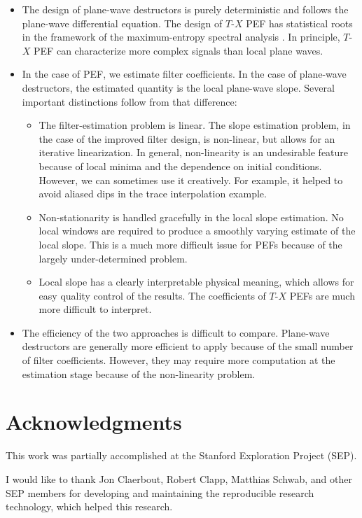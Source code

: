 \begin{itemize}
\item The design of plane-wave destructors is purely deterministic and
  follows the plane-wave differential equation. The design of $T$-$X$
  PEF has statistical roots in the framework of the maximum-entropy
  spectral analysis \cite[]{Burg.sepphd.6}. In principle, $T$-$X$ PEF
  can characterize more complex signals than local plane waves.
\item In the case of PEF, we estimate filter coefficients. In the
  case of plane-wave destructors, the estimated quantity is the local
  plane-wave slope.  Several important distinctions follow from that
  difference:
\begin{itemize}
\item The filter-estimation problem is linear. The slope estimation
  problem, in the case of the improved filter design, is non-linear,
  but allows for an iterative linearization. In general, non-linearity
  is an undesirable feature because of local minima and the dependence
  on initial conditions. However, we can sometimes use it creatively.
  For example, it helped to avoid aliased dips in the trace
  interpolation example.
\item Non-stationarity is handled gracefully in the local slope
  estimation. No local windows are required to produce a smoothly
  varying estimate of the local slope. This is a much more difficult
  issue for PEFs because of the largely under-determined problem.
\item Local slope has a clearly interpretable physical meaning, which
  allows for easy quality control of the results. The coefficients
  of $T$-$X$ PEFs are much more difficult to interpret.
\end{itemize}
\item The efficiency of the two approaches is difficult to compare.
  Plane-wave destructors are generally more efficient to apply because
  of the small number of filter coefficients. However, they
  may require more computation at the estimation stage because of the
  non-linearity problem.
\end{itemize}

\section{Acknowledgments}
This work was partially accomplished at
the Stanford Exploration Project (SEP).

I would like to thank Jon Claerbout, Robert Clapp, Matthias Schwab, and
other SEP members for developing and maintaining the reproducible
research technology, which helped this research. 

